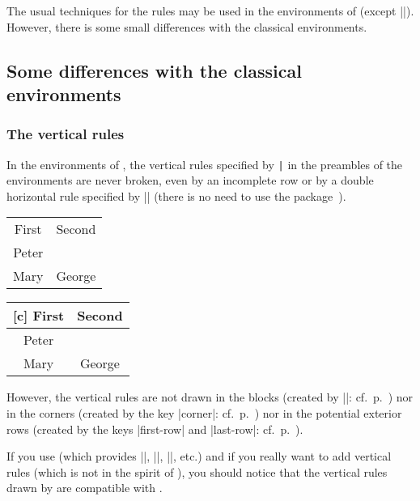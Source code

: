 \documentclass[dvipsnames]{article}%
\begin{document}
\label{rules}

The usual techniques for the rules may be used in the environments of
 (except |\vline|). However, there is some small differences
with the classical environments.

\bigskip
\subsection{Some differences with the classical environments}

\subsubsection{The vertical rules}

In the environments of , the vertical rules specified by
\verb+|+ in the preambles of the environments are never broken, even by an
incomplete row or by a double horizontal rule specified by |\hline\hline|
(there is no need to use the package~).

\bigskip
\begin{Code}[width=10cm]
\begin{NiceTabular}{|c|c|} \hline
First & Second \\ \emph{\hline\hline}
Peter \\ \hline
Mary & George\\ \hline
\end{NiceTabular}
\end{Code}
\begin{NiceTabular}{|c|c|}[c] \hline
First & Second \\ \hline\hline
Peter \\ \hline
Mary  & George \\ \hline
\end{NiceTabular}


\bigskip
However, the vertical rules are not drawn in the blocks (created by |\Block|:
cf.~p.~\pageref{Block}) nor in the corners (created by the key |corner|:
cf.~p.~\pageref{corners}) nor in the potential exterior rows (created by the
keys |first-row| and |last-row|: cf.~p.~\pageref{exterior}).

\bigskip
{}
If you use  (which provides |\toprule|, |\midrule|,
|\bottomrule|, etc.) and if you really want to add vertical rules (which is
not in the spirit of ), you should notice that the vertical rules
drawn by  are compatible with .
\end{document}
